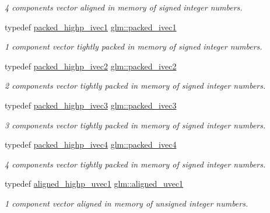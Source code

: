 \begin{DoxyCompactItemize}
\begin{DoxyCompactList}\small\item\em 4 components vector aligned in memory of signed integer numbers. \end{DoxyCompactList}\item 
typedef \hyperlink{group__gtc__type__aligned_ga7fde67656fb5726169114054992f0a3f}{packed\+\_\+highp\+\_\+ivec1} \hyperlink{group__gtc__type__aligned_gaed29e084c549e66663667ea4127b30a5}{glm\+::packed\+\_\+ivec1}
\begin{DoxyCompactList}\small\item\em 1 component vector tightly packed in memory of signed integer numbers. \end{DoxyCompactList}\item 
typedef \hyperlink{group__gtc__type__aligned_gae362d70a8be88cc43b6c1ec0992e73db}{packed\+\_\+highp\+\_\+ivec2} \hyperlink{group__gtc__type__aligned_gabc173f3a8e93f2970df6704371541da1}{glm\+::packed\+\_\+ivec2}
\begin{DoxyCompactList}\small\item\em 2 components vector tightly packed in memory of signed integer numbers. \end{DoxyCompactList}\item 
typedef \hyperlink{group__gtc__type__aligned_ga56b9f0123506edc416bbcf957d3ce678}{packed\+\_\+highp\+\_\+ivec3} \hyperlink{group__gtc__type__aligned_gae3121f35a569fd14475ff5f4d28bd98e}{glm\+::packed\+\_\+ivec3}
\begin{DoxyCompactList}\small\item\em 3 components vector tightly packed in memory of signed integer numbers. \end{DoxyCompactList}\item 
typedef \hyperlink{group__gtc__type__aligned_gabf988b7dc66612bc1d4c9ce44d5b5642}{packed\+\_\+highp\+\_\+ivec4} \hyperlink{group__gtc__type__aligned_gaf87b2eccca075255f5ed368dfb1ecc31}{glm\+::packed\+\_\+ivec4}
\begin{DoxyCompactList}\small\item\em 4 components vector tightly packed in memory of signed integer numbers. \end{DoxyCompactList}\item 
typedef \hyperlink{group__gtc__type__aligned_ga3ba8c6f6b81f57159b0536ce5d4339d0}{aligned\+\_\+highp\+\_\+uvec1} \hyperlink{group__gtc__type__aligned_gab0fbe9830a7129d9135b558b30eed930}{glm\+::aligned\+\_\+uvec1}
\begin{DoxyCompactList}\small\item\em 1 component vector aligned in memory of unsigned integer numbers. \end{DoxyCompactList}\item 

\end{DoxyCompactItemize}
